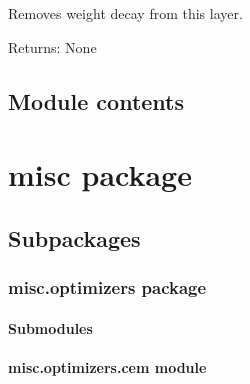 \documentclass[letterpaper,10pt,english,openany,oneside]{sphinxmanual}
\begin{document}
\begin{fulllineitems}

\begin{fulllineitems}
\label{\detokenize{_modules/layers:layers.FC.FC.unset_weight_decay}}
Removes weight decay from this layer.

Returns: None

\end{fulllineitems}


\end{fulllineitems}



\subsection{Module contents}
\label{\detokenize{_modules/layers:module-layers}}\label{\detokenize{_modules/layers:module-contents}}

\section{misc package}
\label{\detokenize{_modules/misc:misc-package}}\label{\detokenize{_modules/misc::doc}}

\subsection{Subpackages}
\label{\detokenize{_modules/misc:subpackages}}

\subsubsection{misc.optimizers package}
\label{\detokenize{_modules/misc.optimizers:misc-optimizers-package}}\label{\detokenize{_modules/misc.optimizers::doc}}

\paragraph{Submodules}
\label{\detokenize{_modules/misc.optimizers:submodules}}

\paragraph{misc.optimizers.cem module}
\label{\detokenize{_modules/misc.optimizers:module-misc.optimizers.cem}}\label{\detokenize{_modules/misc.optimizers:misc-optimizers-cem-module}}
\end{document}

